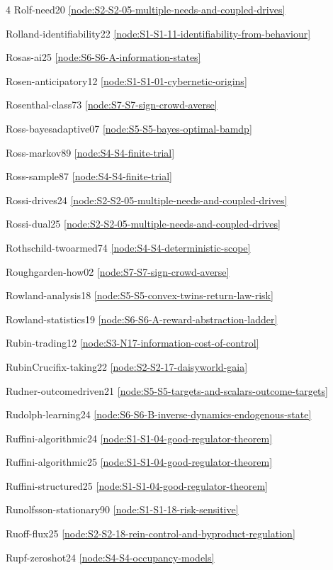 \documentclass[10pt]{article}
\begin{document}
{\begin{multicols}{4}
Rolf-need20 \hfill \ref{node:S2-S2-05-multiple-needs-and-coupled-drives}\par
Rolland-identifiability22 \hfill \ref{node:S1-S1-11-identifiability-from-behaviour}\par
Rosas-ai25 \hfill \ref{node:S6-S6-A-information-states}\par
Rosen-anticipatory12 \hfill \ref{node:S1-S1-01-cybernetic-origins}\par
Rosenthal-class73 \hfill \ref{node:S7-S7-sign-crowd-averse}\par
Ross-bayesadaptive07 \hfill \ref{node:S5-S5-bayes-optimal-bamdp}\par
Ross-markov89 \hfill \ref{node:S4-S4-finite-trial}\par
Ross-sample87 \hfill \ref{node:S4-S4-finite-trial}\par
Rossi-drives24 \hfill \ref{node:S2-S2-05-multiple-needs-and-coupled-drives}\par
Rossi-dual25 \hfill \ref{node:S2-S2-05-multiple-needs-and-coupled-drives}\par
Rothschild-twoarmed74 \hfill \ref{node:S4-S4-deterministic-scope}\par
Roughgarden-how02 \hfill \ref{node:S7-S7-sign-crowd-averse}\par
Rowland-analysis18 \hfill \ref{node:S5-S5-convex-twins-return-law-risk}\par
Rowland-statistics19 \hfill \ref{node:S6-S6-A-reward-abstraction-ladder}\par
Rubin-trading12 \hfill \ref{node:S3-N17-information-cost-of-control}\par
RubinCrucifix-taking22 \hfill \ref{node:S2-S2-17-daisyworld-gaia}\par
Rudner-outcomedriven21 \hfill \ref{node:S5-S5-targets-and-scalars-outcome-targets}\par
Rudolph-learning24 \hfill \ref{node:S6-S6-B-inverse-dynamics-endogenous-state}\par
Ruffini-algorithmic24 \hfill \ref{node:S1-S1-04-good-regulator-theorem}\par
Ruffini-algorithmic25 \hfill \ref{node:S1-S1-04-good-regulator-theorem}\par
Ruffini-structured25 \hfill \ref{node:S1-S1-04-good-regulator-theorem}\par
Runolfsson-stationary90 \hfill \ref{node:S1-S1-18-risk-sensitive}\par
Ruoff-flux25 \hfill \ref{node:S2-S2-18-rein-control-and-byproduct-regulation}\par
Rupf-zeroshot24 \hfill \ref{node:S4-S4-occupancy-models}\par

\end{multicols}}
\end{document}
